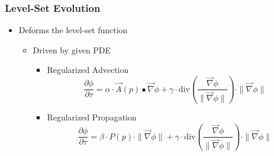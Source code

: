 \begin{frame}
\frametitle{Level-Set Evolution}
\begin{itemize}
  \item Deforms the level-set function
  \begin{itemize}
    \item Driven by given PDE
    \begin{itemize}
      \item<2->Regularized Advection
      \begin{equation*}
      \frac{\partial \phi}{\partial \tau} =
      \alpha \cdot \overrightarrow{A}(p) \bullet \overrightarrow{\nabla} \phi +
      \gamma \cdot \text{div}\left( \frac{\overrightarrow{\nabla}
      \phi}{\|\overrightarrow{\nabla} \phi\|} \right) \cdot
    \|\overrightarrow{\nabla}
      \phi\|
      \end{equation*}

      \item<3->Regularized Propagation
      \begin{equation*}
      \frac{\partial \phi}{\partial \tau} =
      \beta \cdot P(p) \cdot \|\overrightarrow{\nabla} \phi \| +
      \gamma \cdot \text{div}\left( \frac{\overrightarrow{\nabla}
      \phi}{\|\overrightarrow{\nabla} \phi\|} \right) \cdot
    \|\overrightarrow{\nabla}
      \phi\|
      \end{equation*}
\end{itemize}
\end{itemize}
\end{itemize}
\end{frame}

